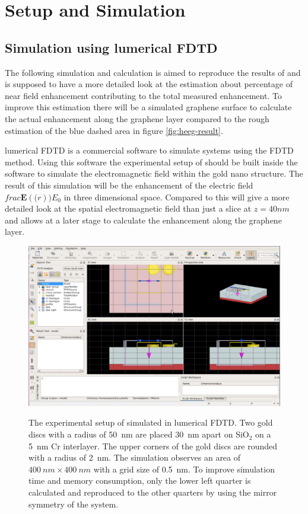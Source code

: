 \newpage
\section{Setup and Simulation}
\subsection{Simulation using lumerical FDTD}

The following simulation and calculation is aimed to reproduce the results of \cite{heeg} and is supposed to have a more detailed look at the estimation about percentage of near field enhancement contributing to the total measured enhancement. To improve this estimation there will be a simulated graphene surface to calculate the actual enhancement along the graphene layer compared to the rough estimation of the blue dashed area in figure \ref{fig:heeg-result}.

lumerical FDTD is a commercial software to simulate systems using the FDTD method. Using this software the experimental setup of \cite{heeg} should be built inside the software to simulate the electromagnetic field within the gold nano structure. The result of this simulation will be the enhancement of the electric field $frac{\mathbf{E}(\mathbf(r))}{E_0}$ in three dimensional space. Compared to \cite{heeg} this will give a more detailed look at the spatial electromagnetic field than just a slice at $z=40nm$ and allows at a later stage to calculate the enhancement along the graphene layer.

\begin{figure}[!h]
  \includegraphics[width=\textwidth]{./images/lumerical.png}
  \label{fig:lumerical}
  \caption{The experimental setup of \cite{heeg} simulated in lumerical FDTD. Two gold discs with a radius of \SI{50}{nm} are placed \SI{30}{nm} apart on SiO$_2$ on a \SI{5}{nm} Cr interlayer. The upper corners of the gold discs are rounded with a radius of \SI{2}{nm}. The simulation observes an area of $\SI{400}{nm}\times\SI{400}{nm}$ with a grid size of \SI{0.5}{nm}. To improve simulation time and memory consumption, only the lower left quarter is calculated and reproduced to the other quarters by using the mirror symmetry of the system.}
\end{figure}

